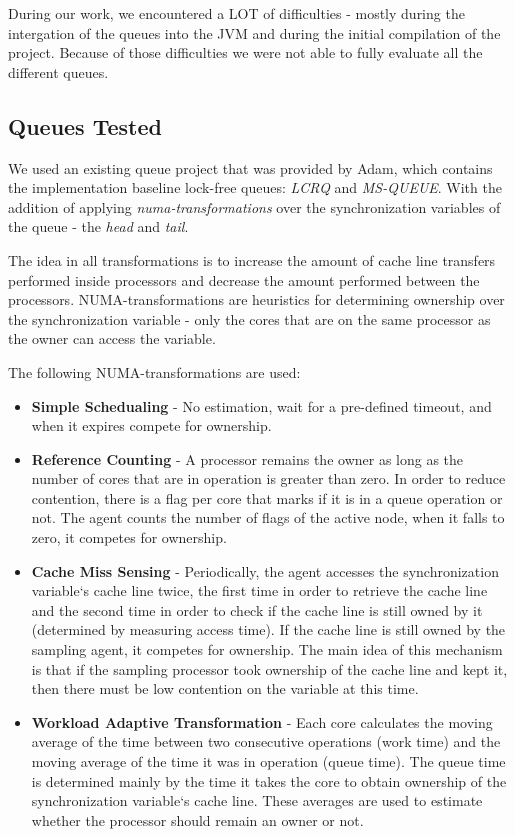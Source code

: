 \documentclass{article}
\begin{document}
 During our work, we encountered a LOT of difficulties - mostly during the intergation of the queues into the JVM and during the initial compilation of the project. Because of those difficulties we were not able to fully evaluate all the different queues.

 \subsection{Queues Tested}

 We used an existing queue project that was provided by Adam, which contains the implementation baseline lock-free queues: \textit{LCRQ\cite{lcrq}} and \textit{MS-QUEUE}\cite{msqueue}. With the addition of applying \textit{numa-transformations} over the synchronization variables of the queue - the \textit{head} and \textit{tail}.

 The idea in all transformations is to increase the amount of cache line transfers performed inside processors and decrease the amount performed between the processors.
 NUMA-transformations are heuristics for determining ownership over the synchronization variable - only the cores that are on the same processor as the owner can access the variable.

 The following NUMA-transformations are used: 

 \begin{itemize}
   \item \textbf{Simple Schedualing} - No estimation, wait for a pre-defined timeout, and when it expires compete for ownership.
   \item \textbf{Reference Counting} - A processor remains the owner as long as the number of cores that are in operation is greater than zero. In order to reduce contention, there is a flag per core
	 that marks if it is in a queue operation or not. The agent counts the number of flags
	 of the active node, when it falls to zero, it competes for ownership.
   \item \textbf{Cache Miss Sensing} - Periodically, the agent accesses the synchronization variable`s
	   cache line twice, the first time in order to retrieve the cache line and the second time
	   in order to check if the cache line is still owned by it (determined by measuring access
	   time). If the cache line is still owned by the sampling agent, it competes for ownership.
	   The main idea of this mechanism is that if the sampling processor took ownership of
	   the cache line and kept it, then there must be low contention on the variable at this
	   time.
   \item \textbf{Workload Adaptive Transformation} - Each core calculates
	   the moving average of the time between two consecutive operations (work time) and the
	   moving average of the time it was in operation (queue time). The queue time is determined
	   mainly by the time it takes the core to obtain ownership of the synchronization variable`s
	   cache line. These averages are used to estimate whether the processor should remain an
	   owner or not.
 \end{itemize}
\end{document}
